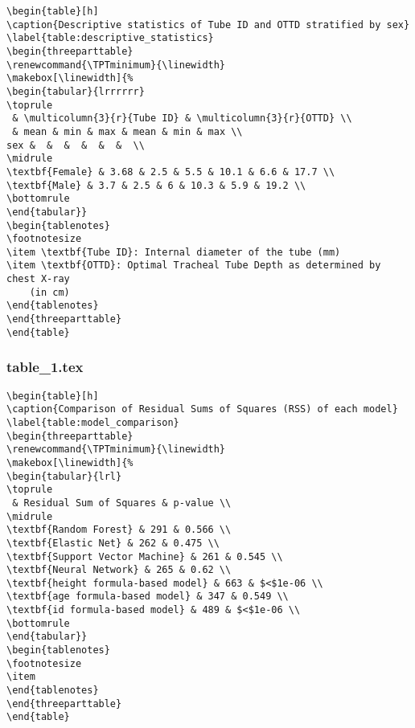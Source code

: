\documentclass[11pt]{article}
\begin{document}
\begin{Verbatim}[tabsize=4]
\begin{table}[h]
\caption{Descriptive statistics of Tube ID and OTTD stratified by sex}
\label{table:descriptive_statistics}
\begin{threeparttable}
\renewcommand{\TPTminimum}{\linewidth}
\makebox[\linewidth]{%
\begin{tabular}{lrrrrrr}
\toprule
 & \multicolumn{3}{r}{Tube ID} & \multicolumn{3}{r}{OTTD} \\
 & mean & min & max & mean & min & max \\
sex &  &  &  &  &  &  \\
\midrule
\textbf{Female} & 3.68 & 2.5 & 5.5 & 10.1 & 6.6 & 17.7 \\
\textbf{Male} & 3.7 & 2.5 & 6 & 10.3 & 5.9 & 19.2 \\
\bottomrule
\end{tabular}}
\begin{tablenotes}
\footnotesize
\item \textbf{Tube ID}: Internal diameter of the tube (mm)
\item \textbf{OTTD}: Optimal Tracheal Tube Depth as determined by chest X-ray
	(in cm)
\end{tablenotes}
\end{threeparttable}
\end{table}

\end{Verbatim}

\subsubsection*{table\_1.tex}

\begin{Verbatim}[tabsize=4]
\begin{table}[h]
\caption{Comparison of Residual Sums of Squares (RSS) of each model}
\label{table:model_comparison}
\begin{threeparttable}
\renewcommand{\TPTminimum}{\linewidth}
\makebox[\linewidth]{%
\begin{tabular}{lrl}
\toprule
 & Residual Sum of Squares & p-value \\
\midrule
\textbf{Random Forest} & 291 & 0.566 \\
\textbf{Elastic Net} & 262 & 0.475 \\
\textbf{Support Vector Machine} & 261 & 0.545 \\
\textbf{Neural Network} & 265 & 0.62 \\
\textbf{height formula-based model} & 663 & $<$1e-06 \\
\textbf{age formula-based model} & 347 & 0.549 \\
\textbf{id formula-based model} & 489 & $<$1e-06 \\
\bottomrule
\end{tabular}}
\begin{tablenotes}
\footnotesize
\item
\end{tablenotes}
\end{threeparttable}
\end{table}

\end{Verbatim}




\end{document}
